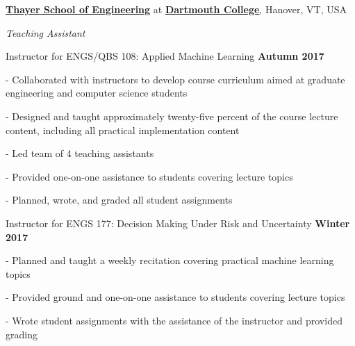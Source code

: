 \href{https://engineering.dartmouth.edu/}{\textbf{Thayer School of Engineering}}
at 
\href{https://dartmouth.edu}{\textbf{Dartmouth College}},
Hanover, VT, USA

\begin{innerlist}
\item[] \textit{Teaching Assistant}%
    \begin{innerlist}
        \item[] Instructor for ENGS/QBS 108: Applied Machine Learning
            \hfill \textbf{Autumn 2017}
        \begin{innerlist}
            \item[-] Collaborated with instructors to develop course curriculum aimed at graduate engineering and computer science students
            \item[-] Designed and taught approximately twenty-five percent of the course lecture content, including all practical implementation content
            \item[-] Led team of 4 teaching assistants
            \item[-] Provided one-on-one assistance to students covering lecture topics
            \item[-] Planned, wrote, and graded all student assignments
        \end{innerlist}


        \item[] Instructor for ENGS 177: Decision Making Under Risk and Uncertainty
            \hfill \textbf{Winter 2017}
        \begin{innerlist}
            \item[-] Planned and taught a weekly recitation covering practical machine learning topics
            \item[-] Provided ground and one-on-one assistance to students covering lecture topics
            \item[-] Wrote student assignments with the assistance of the instructor and provided grading
        \end{innerlist}

    \end{innerlist}

\end{innerlist}


